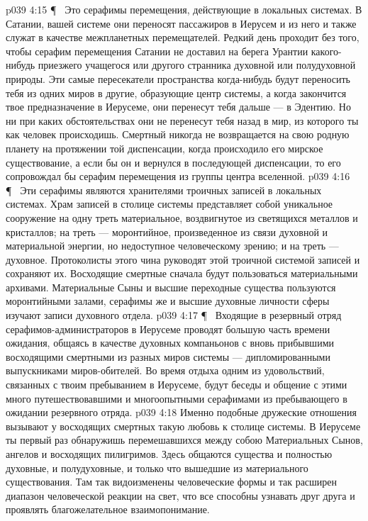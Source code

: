 \vs p039 4:15 \P\ \bibnobreakspace {} Это серафимы перемещения, действующие в локальных системах. В Сатании, вашей системе они переносят пассажиров в Иерусем и из него и также служат в качестве межпланетных перемещателей. Редкий день проходит без того, чтобы серафим перемещения Сатании не доставил на берега Урантии какого\hyp{}нибудь приезжего учащегося или другого странника духовной или полудуховной природы. Эти самые пересекатели пространства когда\hyp{}нибудь будут переносить тебя из одних миров в другие, образующие центр системы, а когда закончится твое предназначение в Иерусеме, они перенесут тебя дальше --- в Эдентию. Но ни при каких обстоятельствах они не перенесут тебя назад в мир, из которого ты как человек происходишь. Смертный никогда не возвращается на свою родную планету на протяжении той диспенсации, когда происходило его мирское существование, а если бы он и вернулся в последующей диспенсации, то его сопровождал бы серафим перемещения из группы центра вселенной.
\vs p039 4:16 \P\ \bibnobreakspace {} Эти серафимы являются хранителями троичных записей в локальных системах. Храм записей в столице системы представляет собой уникальное сооружение на одну треть материальное, воздвигнутое из светящихся металлов и кристаллов; на треть --- моронтийное, произведенное из связи духовной и материальной энергии, но недоступное человеческому зрению; и на треть --- духовное. Протоколисты этого чина руководят этой троичной системой записей и сохраняют их. Восходящие смертные сначала будут пользоваться материальными архивами. Материальные Сыны и высшие переходные существа пользуются моронтийными залами, серафимы же и высшие духовные личности сферы изучают записи духовного отдела.
\vs p039 4:17 \P\ \bibnobreakspace {} Входящие в резервный отряд серафимов\hyp{}администраторов в Иерусеме проводят большую часть времени ожидания, общаясь в качестве духовных компаньонов с вновь прибывшими восходящими смертными из разных миров системы --- дипломированными выпускниками миров\hyp{}обителей. Во время отдыха одним из удовольствий, связанных с твоим пребыванием в Иерусеме, будут беседы и общение с этими много путешествовавшими и многоопытными серафимами из пребывающего в ожидании резервного отряда.
\vs p039 4:18 Именно подобные дружеские отношения вызывают у восходящих смертных такую любовь к столице системы. В Иерусеме ты первый раз обнаружишь перемешавшихся между собою Материальных Сынов, ангелов и восходящих пилигримов. Здесь общаются существа и полностью духовные, и полудуховные, и только что вышедшие из материального существования. Там так видоизменены человеческие формы и так расширен диапазон человеческой реакции на свет, что все способны узнавать друг друга и проявлять благожелательное взаимопонимание.
